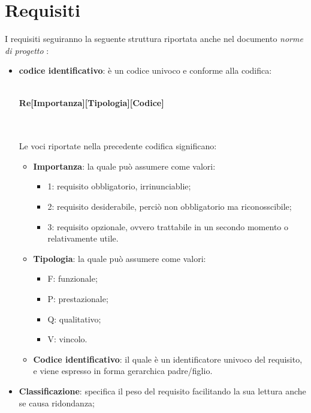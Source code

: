 \renewcommand{\arraystretch}{1.5}

\section{Requisiti}
I requisiti seguiranno la seguente struttura riportata anche nel documento \emph{norme di progetto} :
				\begin{itemize}
					\item \textbf{codice identificativo}: è un codice univoco e conforme alla codifica: \\ \\
					\centerline{\textbf{Re[Importanza][Tipologia][Codice]}} \\ \\
					Le voci riportate nella precedente codifica significano: 
					\begin{itemize}
						\item \textbf{Importanza}: la quale può assumere come valori:
						\begin{itemize}
							\item 1: requisito obbligatorio, irrinunciablie;
							\item 2: requisito desiderabile, perciò non obbligatorio ma riconosscibile;
							\item 3: requisito opzionale, ovvero trattabile in un secondo momento o relativamente utile.
						\end{itemize}
						\item \textbf{Tipologia}: la quale può assumere come valori:
						\begin{itemize}
							\item F: funzionale;
							\item P: prestazionale;
							\item Q: qualitativo;
							\item V: vincolo.
						\end{itemize}
						\item \textbf{Codice identificativo}: il quale è un identificatore univoco del requisito, e viene espresso in forma gerarchica padre/figlio.
					\end{itemize}
					\item \textbf{Classificazione}: specifica il peso del requisito facilitando la sua lettura anche se causa ridondanza;

\end{itemize}
